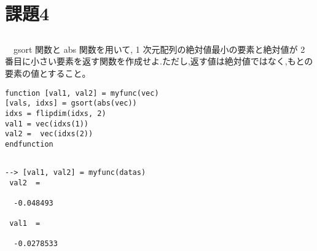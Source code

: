\documentclass[a4j, 11pt]{jarticle}
\begin{document}
\section{課題4}
\label{sec:org1448440}
\subsection{}
\label{sec:orgd6e0ba6}
　gsort 関数と abs 関数を用いて, 1 次元配列の絶対値最小の要素と絶対値が 2 番目に小さい要素を返す関数を作成せよ.ただし,返す値は絶対値ではなく,もとの\\
要素の値とすること。\\
\begin{verbatim}
function [val1, val2] = myfunc(vec)
[vals, idxs] = gsort(abs(vec))
idxs = flipdim(idxs, 2)
val1 = vec(idxs(1))
val2 =  vec(idxs(2))
endfunction
\end{verbatim}

\subsection{}
\label{sec:org378b8ef}
\begin{verbatim}
--> [val1, val2] = myfunc(datas)
 val2  = 

  -0.048493

 val1  = 

  -0.0278533
\end{verbatim}
\end{document}
